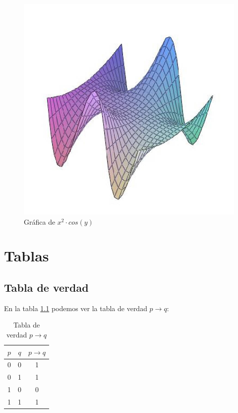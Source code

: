 \documentclass[letterpaper,12pt]{book}
\begin{document}
\begin{figure}[h!]
\centering
\includegraphics[scale=0.35]{grafica10.jpg}
\caption{Gráfica de $x^2\cdot cos(y)$}\label{cap6f1}
\end{figure}

\chapter{Tablas}

\section{Tabla de verdad}

En la tabla \ref{tab:cap7t1} podemos ver la tabla de verdad $p \rightarrow q$:

\begin{table}[ht]
	\caption{Tabla de verdad $p \rightarrow q$}
	\begin{center}
		\begin{tabular}{|c|c|c|} \hline
			$p$ & $q$ & $p \rightarrow q$\\\hline
			0 & 0 & 1 \\
			0 & 1 & 1 \\
			1 & 0 & 0 \\
			1 & 1 & 1 \\\hline
		\end{tabular}
	\end{center}
	\label{tab:cap7t1}
\end{table}
\end{document}
